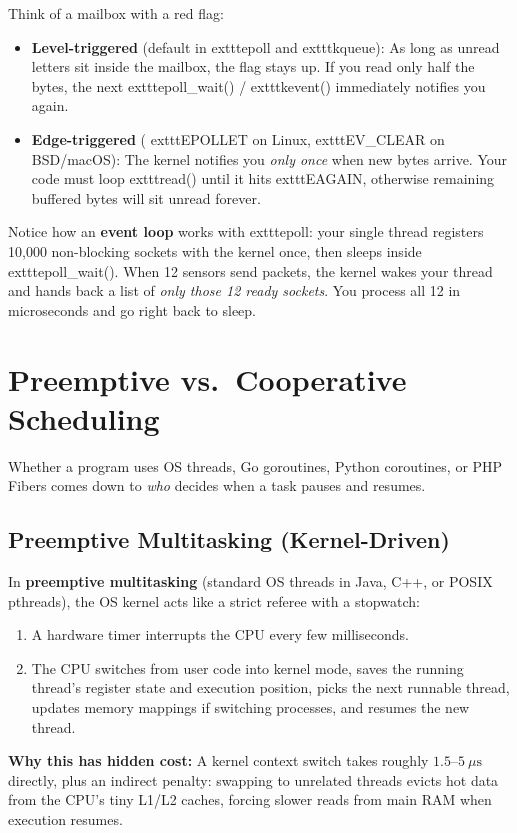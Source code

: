 \begin{intuitionbox}
Think of a mailbox with a red flag:
\begin{itemize}[leftmargin=15pt]
  \item \textbf{Level-triggered} (default in 	exttt{epoll} and 	exttt{kqueue}): As long as unread letters sit inside the mailbox, the flag stays up. If you read only half the bytes, the next 	exttt{epoll\_wait()} / 	exttt{kevent()} immediately notifies you again.
  \item \textbf{Edge-triggered} (	exttt{EPOLLET} on Linux, 	exttt{EV\_CLEAR} on BSD/macOS): The kernel notifies you \emph{only once} when new bytes arrive. Your code must loop 	exttt{read()} until it hits 	exttt{EAGAIN}, otherwise remaining buffered bytes will sit unread forever.
\end{itemize}
\end{intuitionbox}

Notice how an \textbf{event loop} works with 	exttt{epoll}: your single thread registers 10,000 non-blocking sockets with the kernel once, then sleeps inside 	exttt{epoll\_wait()}. When 12 sensors send packets, the kernel wakes your thread and hands back a list of \emph{only those 12 ready sockets}. You process all 12 in microseconds and go right back to sleep.

\section{Preemptive vs.\ Cooperative Scheduling}

Whether a program uses OS threads, Go goroutines, Python coroutines, or PHP Fibers comes down to \emph{who} decides when a task pauses and resumes.

\subsection{Preemptive Multitasking (Kernel-Driven)}

In \textbf{preemptive multitasking} (standard OS threads in Java, C++, or POSIX pthreads), the OS kernel acts like a strict referee with a stopwatch:
\begin{enumerate}[leftmargin=15pt]
  \item A hardware timer interrupts the CPU every few milliseconds.
  \item The CPU switches from user code into kernel mode, saves the running thread's register state and execution position, picks the next runnable thread, updates memory mappings if switching processes, and resumes the new thread.
\end{enumerate}
\textbf{Why this has hidden cost:} A kernel context switch takes roughly $1.5\text{--}5\ \mu\text{s}$ directly, plus an indirect penalty: swapping to unrelated threads evicts hot data from the CPU's tiny L1/L2 caches, forcing slower reads from main RAM when execution resumes.


